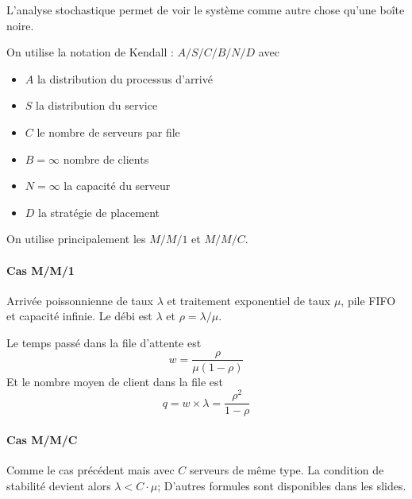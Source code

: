 \documentclass{article}
\begin{document}
L'analyse stochastique permet de voir le système comme autre chose qu'une boîte noire.

On utilise la notation de Kendall :
$A/S/C/B/N/D$ avec 
\begin{itemize}
\item $A$ la distribution du processus d'arrivé
\item $S$ la distribution du service
\item $C$ le nombre de serveurs par file
\item $B = \infty$ nombre de clients
\item $N = \infty$ la capacité du serveur
\item $D$ la stratégie de placement
\end{itemize}

On utilise principalement les $M/M/1$ et $M/M/C$.

\paragraph{Cas M/M/1}
Arrivée poissonnienne de taux $\lambda$ et traitement exponentiel de taux $\mu$, pile FIFO et capacité infinie. Le débi est $\lambda$ et $ \rho = \lambda/\mu$.

Le temps passé dans la file d'attente est 
\[w = \dfrac{\rho}{\mu(1-\rho)}\]
Et le nombre moyen de client dans la file est
\[q = w \times \lambda = \dfrac{\rho^2}{1-\rho}\]

\paragraph{Cas M/M/C}
Comme le cas précédent mais avec $C$ serveurs de même type. La condition de stabilité devient alors $\lambda< C\cdot \mu$; D'autres formules sont disponibles dans les slides.
\end{document}
